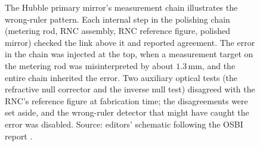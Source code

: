 \begin{figure}[ht]
\caption[The Hubble primary mirror as a wrong-ruler
chain]{The Hubble primary mirror's measurement chain illustrates the
wrong-ruler pattern. Each internal step in the polishing chain
(metering rod, RNC assembly, RNC reference figure, polished mirror)
checked the link above it and reported agreement. The error in the
chain was injected at the top, when a measurement target on the
metering rod was misinterpreted by about $1.3 \,\si{\milli\meter}$,
and the entire chain inherited the error. Two auxiliary optical tests
(the refractive null corrector and the inverse null test) disagreed
with the RNC's reference figure at fabrication time; the
disagreements were set aside, and the wrong-ruler detector that
might have caught the error was disabled. Source: editors' schematic
following the OSBI report
\cite{acc:nasa-hubble-optical-systems-1990}.}
\label{fig:vol01:ch07:hubble-wrong-ruler}
\end{figure}
